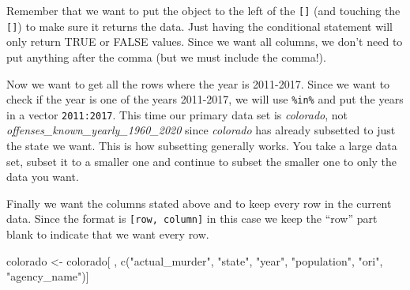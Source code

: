 \documentclass[
]{krantz}
\makeatletter
\newenvironment{Shaded}{\begin{snugshade}}{\end{snugshade}}
\newcommand{\DecValTok}[1]{\textcolor[rgb]{0.06,0.06,0.06}{#1}}
\newcommand{\FunctionTok}[1]{\textcolor[rgb]{0,0,0}{#1}}
\newcommand{\NormalTok}[1]{#1}
\newcommand{\OtherTok}[1]{\textcolor[rgb]{0.37,0.37,0.37}{#1}}
\newcommand{\SpecialCharTok}[1]{\textcolor[rgb]{0,0,0}{#1}}
\newcommand{\StringTok}[1]{\textcolor[rgb]{0.5,0.5,0.5}{#1}}
\newenvironment{kframe}{%
\medskip{}
\setlength{\fboxsep}{.8em}
 \def\at@end@of@kframe{}%
 \ifinner\ifhmode%
  \def\at@end@of@kframe{\end{minipage}}%
  \begin{minipage}{\columnwidth}%
 \fi\fi%
 \def\FrameCommand##1{\hskip\@totalleftmargin \hskip-\fboxsep
 \colorbox{shadecolor}{##1}\hskip-\fboxsep
     \hskip-\linewidth \hskip-\@totalleftmargin \hskip\columnwidth}%
 \MakeFramed {\advance\hsize-\width
   \@totalleftmargin\z@ \linewidth\hsize
   \@setminipage}}%
 {\par\unskip\endMakeFramed%
 \at@end@of@kframe}
\renewenvironment{Shaded}{\begin{kframe}}{\end{kframe}}
\makeatother
\begin{document}
Remember that we want to put the object to the left of the \texttt{{[}{]}} (and touching the \texttt{{[}{]}}) to make sure it returns the data. Just having the conditional statement will only return TRUE or FALSE values. Since we want all columns, we don't need to put anything after the comma (but we must include the comma!).

\begin{Shaded}
\end{Shaded}

Now we want to get all the rows where the year is 2011-2017. Since we want to check if the year is one of the years 2011-2017, we will use \texttt{\%in\%} and put the years in a vector \texttt{2011:2017}. This time our primary data set is \emph{colorado}, not \emph{offenses\_known\_yearly\_1960\_2020} since \emph{colorado} has already subsetted to just the state we want. This is how subsetting generally works. You take a large data set, subset it to a smaller one and continue to subset the smaller one to only the data you want.

\begin{Shaded}
\end{Shaded}

Finally we want the columns stated above and to keep every row in the current data. Since the format is \texttt{{[}row,\ column{]}} in this case we keep the ``row'' part blank to indicate that we want every row.

\begin{Shaded}
\begin{Highlighting}[]
\NormalTok{colorado }\OtherTok{\textless{}{-}}\NormalTok{ colorado[ , }\FunctionTok{c}\NormalTok{(}\StringTok{"actual\_murder"}\NormalTok{, }\StringTok{"state"}\NormalTok{, }\StringTok{"year"}\NormalTok{, }\StringTok{"population"}\NormalTok{, }\StringTok{"ori"}\NormalTok{, }\StringTok{"agency\_name"}\NormalTok{)]}
\end{Highlighting}
\end{Shaded}
\end{document}

